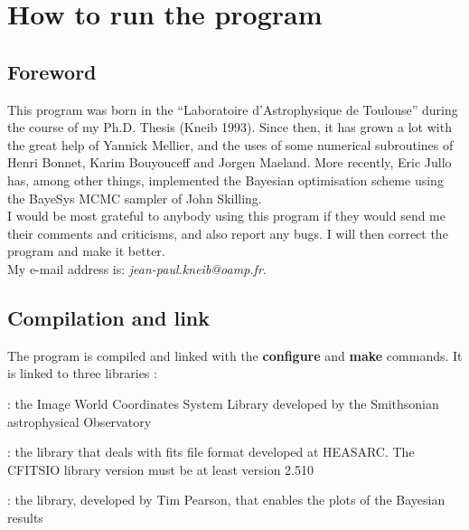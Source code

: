 % 
\chapter{How to run the \lenstool program}


\section{Foreword}

This program was born in the ``Laboratoire d'Astrophysique de Toulouse'' during the
course of my Ph.D. Thesis (Kneib 1993). Since then, it has grown a lot with the
great help of Yannick Mellier, and the uses of some numerical subroutines of
Henri Bonnet, Karim Bouyouceff and Jorgen Maeland. More recently, Eric Jullo
has, among other things,
implemented the Bayesian optimisation scheme using the BayeSys MCMC sampler of
John Skilling.\\

I would be most grateful to anybody using this program if they would  send me
their comments and criticisms, and also report any bugs. I will then correct the
program and make it better.\\

My e-mail address is: \textit{jean-paul.kneib@oamp.fr}.


\section{Compilation and link}

The program is compiled and linked with the \textbf{configure} and \textbf{make}
commands.
It is linked to three libraries :
\begin{description}
\setlength{\itemsep}{-15pt}
\item[libwcs.a]: the Image World Coordinates System Library developed by the 
                 Smithsonian astrophysical Observatory\\
\item[libcfitsio.a]: the library that deals with fits file format developed at 
                     HEASARC. The CFITSIO library version must be at least
                     version 2.510\\
\item[libpgplot.a]: the library, developed by Tim Pearson, that enables the 
                    plots of the Bayesian results\\
\end{description}

